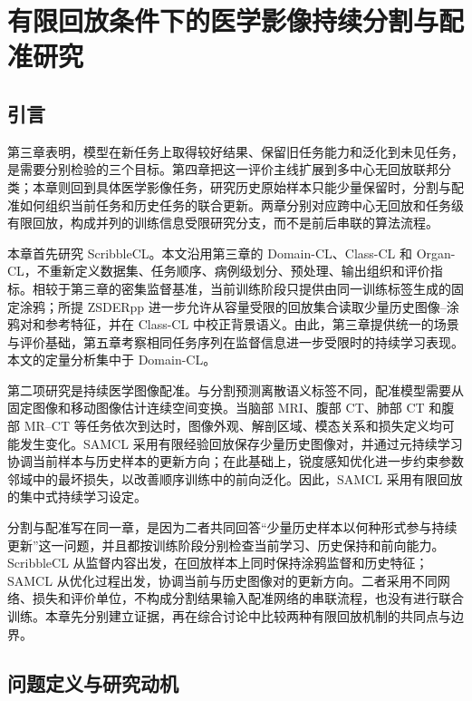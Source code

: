 \chapter{有限回放条件下的医学影像持续分割与配准研究}
\label{chap:task-level-continual-learning}
\setlength{\emergencystretch}{1em}

\section{引言}
\label{sec:task-cl-introduction}

第三章表明，模型在新任务上取得较好结果、保留旧任务能力和泛化到未见任务，是需要分别检验的三个目标。第四章把这一评价主线扩展到多中心无回放联邦分类；本章则回到具体医学影像任务，研究历史原始样本只能少量保留时，分割与配准如何组织当前任务和历史任务的联合更新。两章分别对应跨中心无回放和任务级有限回放，构成并列的训练信息受限研究分支，而不是前后串联的算法流程。

本章首先研究 ScribbleCL。本文沿用第三章的 Domain-CL、Class-CL 和 Organ-CL，不重新定义数据集、任务顺序、病例级划分、预处理、输出组织和评价指标。相较于第三章的密集监督基准，当前训练阶段只提供由同一训练标签生成的固定涂鸦；所提 ZSDERpp 进一步允许从容量受限的回放集合读取少量历史图像--涂鸦对和参考特征，并在 Class-CL 中校正背景语义\cite{zhang2026zscribbleseg,cermelli2020mib}。由此，第三章提供统一的场景与评价基础，第五章考察相同任务序列在监督信息进一步受限时的持续学习表现。本文的定量分析集中于 Domain-CL。

第二项研究是持续医学图像配准。与分割预测离散语义标签不同，配准模型需要从固定图像和移动图像估计连续空间变换。当脑部 MRI、腹部 CT、肺部 CT 和腹部 MR--CT 等任务依次到达时，图像外观、解剖区域、模态关系和损失定义均可能发生变化。SAMCL 采用有限经验回放保存少量历史图像对，并通过元持续学习协调当前样本与历史样本的更新方向；在此基础上，锐度感知优化进一步约束参数邻域中的最坏损失，以改善顺序训练中的前向泛化\cite{wang2024samcl,foret2021sam}。因此，SAMCL 采用有限回放的集中式持续学习设定。

分割与配准写在同一章，是因为二者共同回答“少量历史样本以何种形式参与持续更新”这一问题，并且都按训练阶段分别检查当前学习、历史保持和前向能力。ScribbleCL 从监督内容出发，在回放样本上同时保持涂鸦监督和历史特征；SAMCL 从优化过程出发，协调当前与历史图像对的更新方向。二者采用不同网络、损失和评价单位，不构成分割结果输入配准网络的串联流程，也没有进行联合训练。本章先分别建立证据，再在综合讨论中比较两种有限回放机制的共同点与边界。
\section{问题定义与研究动机}
\label{sec:task-cl-formulation}

